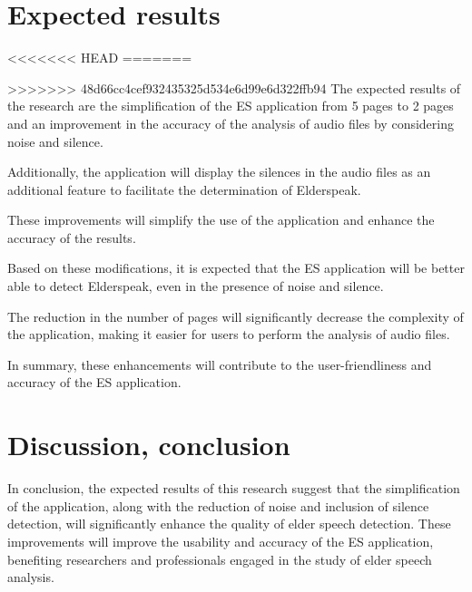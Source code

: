 \documentclass[english]{hogent-article}
\begin{document}
\section{Expected results}%
\label{sec:expected-results}

<<<<<<< HEAD
=======

>>>>>>> 48d66cc4cef932435325d534e6d99e6d322ffb94
The expected results of the research are the simplification of the ES application from 5 pages to 2 pages and an improvement in the accuracy of the analysis of audio files by considering noise and silence.

Additionally, the application will display the silences in the audio files as an additional feature to facilitate the determination of Elderspeak.

These improvements will simplify the use of the application and enhance the accuracy of the results.

Based on these modifications, it is expected that the ES application will be better able to detect Elderspeak, even in the presence of noise and silence.

The reduction in the number of pages will significantly decrease the complexity of the application, making it easier for users to perform the analysis of audio files.

In summary, these enhancements will contribute to the user-friendliness and accuracy of the ES application.

\section{Discussion, conclusion}%
\label{sec:discussion-conclusion}

In conclusion, the expected results of this research suggest that the simplification of the application, along with the reduction of noise and inclusion of silence detection, will significantly enhance the quality of elder speech detection. These improvements will improve the usability and accuracy of the ES application, benefiting researchers and professionals engaged in the study of elder speech analysis.


\printbibliography[heading=bibintoc]
\end{document}
